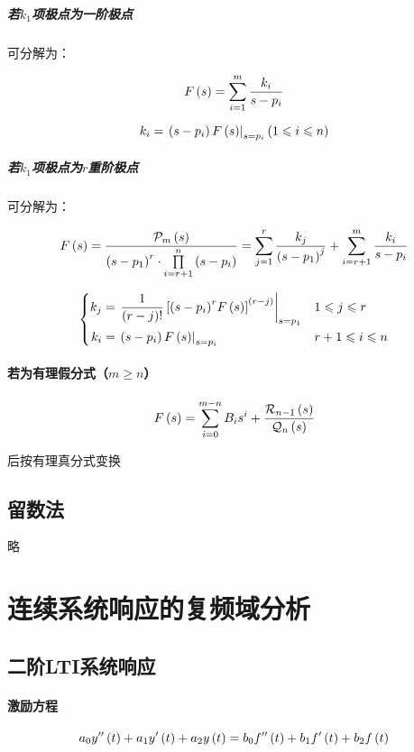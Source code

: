 \documentclass{article}
\begin{document}
\subparagraph{若$k_1$项极点为一阶极点}

可分解为：

\[F\left(s\right)=\sum_{i=1}^m\frac{k_i}{s-p_i}\]

\[k_i=\left.\left(s-p_i\right)F\left(s\right)\right|_{s=p_i}\left(1\leqslant i\leqslant n\right)\]

\subparagraph{若$k_1$项极点为$r$重阶极点}

可分解为：

\[F\left(s\right)=\frac{\mathcal P_m\left(s\right)}{{\left(s-p_1\right)}^r\cdot\prod\limits_{i=r+1}^n\left(s-p_i\right)}
    =\sum_{j=1}^r\frac{k_j}{{\left(s-p_1\right)}^j}+\sum_{i=r+1}^m\frac{k_i}{s-p_i}\]

\[\left\{\begin{aligned}
        k_j & =\left.\frac1{\left(r-j\right)!}\left[{\left(s-p_i\right)}^rF\left(s\right)\right]^{\left(r-j\right)}\right|_{s=p_1} &  & 1\leqslant j\leqslant r   \\
        k_i & =\left.\left(s-p_i\right)F\left(s\right)\right|_{s=p_i}                                                  &  & r+1\leqslant i\leqslant n
    \end{aligned}\right.\]

\paragraph{若为有理假分式（$m\geqslant n$）}

\[F\left(s\right)=\sum_{i=0}^{m-n}B_is^i+\frac{\mathcal R_{n-1}\left(s\right)}{\mathcal Q_n\left(s\right)}\]

后按有理真分式变换

\subsection{留数法}

略

\section{连续系统响应的复频域分析}

\subsection{二阶LTI系统响应}

\paragraph{激励方程}

\[a_0y^{\prime\prime}\left(t\right)+a_1y^\prime\left(t\right)+a_2y\left(t\right)
    =b_0f^{\prime\prime}\left(t\right)+b_1f^\prime\left(t\right)+b_2f\left(t\right)\]
\end{document}
